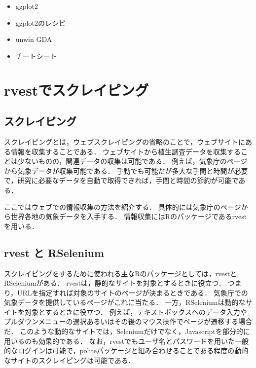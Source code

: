 \documentclass[
]{article}
\providecommand{\tightlist}{%
  \setlength{\itemsep}{0pt}\setlength{\parskip}{0pt}}
\begin{document}
\begin{itemize}
\tightlist
\item
  ggplot2
\item
  ggplot2のレシピ
\item
  unwin GDA
\item
  チートシート
\end{itemize}

\hypertarget{rvest}{%
\section{rvestでスクレイピング}\label{rvest}}

\hypertarget{ux30b9ux30afux30ecux30a4ux30d4ux30f3ux30b0}{%
\subsection{スクレイピング}\label{ux30b9ux30afux30ecux30a4ux30d4ux30f3ux30b0}}

スクレイピングとは，ウェブスクレイピングの省略のことで，ウェブサイトにある情報を収集することである．
ウェブサイトから植生調査データを収集することは少ないものの，関連データの収集は可能である．
例えば，気象庁のページから気象データが収集可能である．
手動でも可能だが多大な手間と時間が必要で，研究に必要なデータを自動で取得できれば，手間と時間の節約が可能である．

ここではウェブでの情報収集の方法を紹介する．
具体的には気象庁のページから世界各地の気象データを入手する．
情報収集にはRのパッケージであるrvestを用いる．

\hypertarget{rvest-ux3068-rselenium}{%
\subsection{rvest と RSelenium}\label{rvest-ux3068-rselenium}}

スクレイピングをするために使われる主なRのパッケージとしては，rvestとRSeleniumがある．
rvestは，静的なサイトを対象とするときに役立つ．
つまり，URLを指定すれば対象のサイトのページが決まるときである．
気象庁での気象データを提供しているページがこれに当たる．
一方，RSeleniumは動的なサイトを対象とするときに役立つ．
例えば，テキストボックスへのデータ入力やプルダウンメニューの選択あるいはその後のマウス操作でページが遷移する場合だ．
このような動的なサイトでは，Seleniumだけでなく，Javascriptを部分的に用いるのも効果的である．
なお，rvestでもユーザ名とパスワードを用いた一般的なログインは可能で，politeパッケージと組み合わせることである程度の動的なサイトのスクレイピングは可能である．
\end{document}
